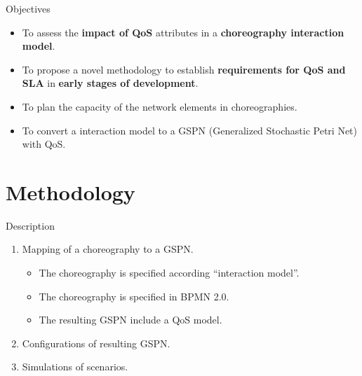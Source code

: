 \documentclass[xcolor=svgnames]{beamer}
\begin{document}
    \begin{frame}
        \begin{block}{Objectives }\vspace{-.3\baselineskip}
        	\begin{itemize}
                  \item To assess the \textbf{impact of QoS} attributes in a \textbf{choreography interaction model}.
		  \item To propose a novel methodology to establish \textbf{requirements for QoS and SLA} in \textbf{early stages of development}.
		  \item To plan the capacity of the network elements in choreographies.
		  \item To convert a interaction model to a GSPN (Generalized Stochastic Petri Net) with QoS.
            \end{itemize}
        \end{block}
    \end{frame}

\section{Methodology}
  \begin{frame}{Description}
    \begin{enumerate}
      \item <1-> Mapping of a choreography to a GSPN.
	  \begin{itemize}
	    \item The choreography is specified according ``interaction model''.
	    \item The choreography is specified in BPMN 2.0.
	    \item The resulting GSPN include a QoS model.
	  \end{itemize}

      \item <2-> Configurations of resulting GSPN.
      \item <3-> Simulations of scenarios.
    \end{enumerate}

  \end{frame}
\end{document}
